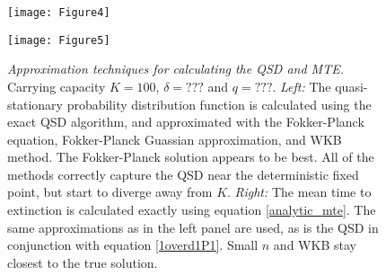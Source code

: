 \begin{figure}[h]
	\centering
	\begin{minipage}{0.49\linewidth}
		\centering
		\texttt{[image: Figure4]}
	\end{minipage}
	\begin{minipage}{0.49\linewidth}
		\centering
		\texttt{[image: Figure5]}
	\end{minipage}
	\caption{\emph{Approximation techniques for calculating the QSD and MTE.} Carrying capacity $K=100$, $\delta=???$ and $q=???$. %
	\emph{Left:} The quasi-stationary probability distribution function is calculated using the exact QSD algorithm, and approximated with the Fokker-Planck equation, Fokker-Planck Guassian approximation, and WKB method. %
	The Fokker-Planck solution appears to be best. %
	All of the methods correctly capture the QSD near the deterministic fixed point, but start to diverge away from $K$. 
	\emph{Right:} The mean time to extinction is calculated exactly using equation \ref{analytic_mte}. The same approximations as in the left panel are used, as is the QSD in conjunction with equation \ref{1overd1P1}. Small $n$ and WKB stay closest to the true solution. 
	}
	\label{techn}
\end{figure}

